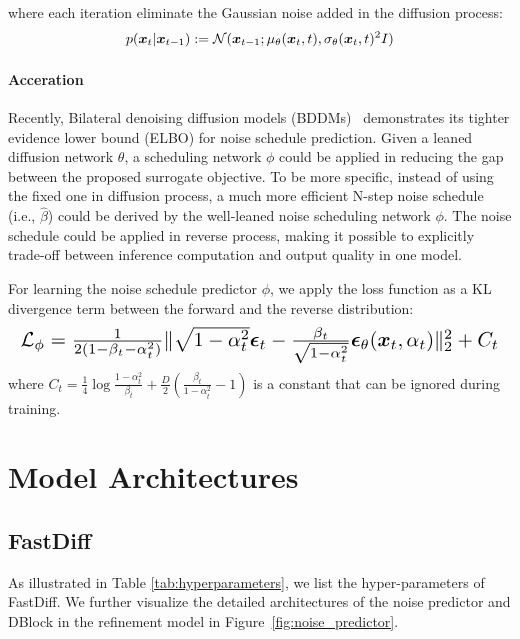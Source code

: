 where each iteration eliminate the Gaussian noise added in the diffusion process:
\begin{align}
    p({\bm{x}}_t|{\bm{x}}_{t-1}) := \mathcal{N}({\bm{x}}_{t-1};\mu_{\theta}({\bm{x}}_t,t), \sigma_{\theta}({\bm{x}}_t,t)^2I)
\end{align}

\paragraph{Acceration} 
Recently, Bilateral denoising diffusion models (BDDMs)~\cite{lam2022bddm} demonstrates its tighter evidence lower bound (ELBO) for noise schedule prediction. Given a leaned diffusion network $\theta$, a scheduling network $\phi$ could be applied in reducing the gap between the proposed surrogate objective. To be more specific, instead of using the fixed one in diffusion process, a much more efficient N-step noise schedule (i.e., $\hat{\beta}$) could be derived by the well-leaned noise scheduling network $\phi$. The noise schedule could be applied in reverse process, making it possible to explicitly trade-off between inference computation and output quality in one model. 

For learning the noise schedule predictor $\phi$, we apply the loss function as a KL divergence term between the forward and the reverse distribution:
\begin{equation} \label{eq: noise_loss}
    \resizebox{.99\linewidth}{!}{$
    \gL_{\phi}= \frac{1}{2(1-\beta_{t}-\alpha_{t}^{2})}\|\sqrt{1-\alpha_{t}^{2}} \beps_{t}-\frac{\beta_{t}}{\sqrt{1-\alpha_{t}^{2}}} \beps_{\theta}(\vx_{t}, \alpha_{t})\|_{2}^{2} +C_{t}
    $}
\end{equation}
where $C_{t} =\frac{1}{4} \log \frac{1-\alpha_{t}^{2}}{\beta_{t}}+\frac{D}{2}(\frac{\beta_{t}}{1-\alpha_{t}^{2}}-1)$ is a constant that can be ignored during training.


\section{Model Architectures} \label{appendix:arch}
\subsection{FastDiff} 
\label{appendix:arch_refime} \label{appendix:noise_predictor}


As illustrated in Table \ref{tab:hyperparameters}, we list the hyper-parameters of FastDiff. We further visualize the detailed architectures of the noise predictor and DBlock in the refinement model in Figure~\ref{fig:noise_predictor}.

